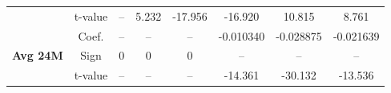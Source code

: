 \documentclass[11pt,english,a4paper,hidelinks]{book}
\begin{document}
\begin{table}[H]
\begin{tabular}{lccccccc}
            & t-value & --        & 5.232     & -17.956   & -16.920   & 10.815    & 8.761     \\
        \cmidrule{1-8}
        \multirow{3}{*}{\textbf{Avg 24M}}
            & Coef.   & --        & --        & --        & -0.010340 & -0.028875 & -0.021639 \\
            & Sign    & 0         & 0         & 0         & –         & –         & –         \\
            & t-value & --        & --        & --        & -14.361   & -30.132   & -13.536   \\
        \bottomrule
    \end{tabular}
    \label{tab:south_america_value_consistency}
\end{table}

\end{document}
